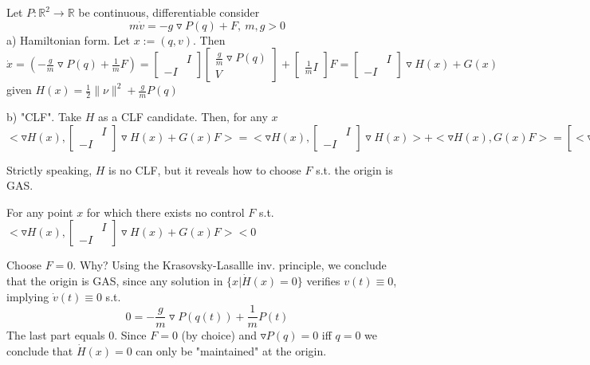 Let $P: \mathbb{R}^2 \to \mathbb{R}$ be continuous, differentiable consider 
\begin{equation*}
m\dot{v}  = - g \triangledown P(q) + F, \ m,g >0
\end{equation*} 
a) Hamiltonian form. Let $x:=(q,v)$. Then $\dot{x} = (-\frac{g}{m}\triangledown P(q) + \frac{1}{m}F)= \begin{bmatrix}
 & I \\
 -I & 
\end{bmatrix}\begin{bmatrix}
 \frac{g}{m}\triangledown P(q) \\
 V 
\end{bmatrix} + \begin{bmatrix}
  \\
 \frac{1}{m}I
\end{bmatrix}F = \begin{bmatrix}
 & I \\
 -I & 
\end{bmatrix} \triangledown H(x) + G(x)$ given $H(x) = \frac{1}{2}\|\nu\|^2 + \frac{g}{m}P(q)$

b) "CLF". Take $H$ as a CLF candidate. Then, for any $x$ 
\begin{equation*}
<\triangledown H(x), \begin{bmatrix}
 & I \\
 -I & 
\end{bmatrix} \triangledown H(x) + G(x)F> = <\triangledown H(x), \begin{bmatrix}
 & I \\
 -I & 
\end{bmatrix} \triangledown H(x)> + <\triangledown H(x), G(x)F> = [<\triangledown H(x), \begin{bmatrix}
 & I \\
 -I & 
\end{bmatrix} \triangledown H(x)> = L_fH(x) = 0] = \frac{1}{m} <\nu, F>
\end{equation*}

Strictly speaking, $H$ is no CLF, but it reveals how to choose $F$ s.t. the origin is GAS.

For any point $x$ for which there exists no control $F$ s.t. $<\triangledown H(x), \begin{bmatrix}
 & I \\
 -I & 
\end{bmatrix} \triangledown H(x) + G(x)F> < 0$

Choose $F = 0$. Why? Using the Krasovsky-Lasallle inv. principle, we conclude that the origin is GAS, since any solution in $\{ x| \dot{H}(x) = 0 \}$ verifies $v(t) \equiv 0$, implying $\dot{v}(t) \equiv 0$ s.t. 
\begin{equation*}
0 = - \frac{g}{m} \triangledown P(q(t)) + \frac{1}{m} P(t)
\end{equation*}
The last part equals 0.  Since $F = 0$ (by choice) and $\triangledown P(q) = 0$ iff $q = 0$ we conclude that $\dot{H}(x) = 0$ can only be "maintained" at the origin.

